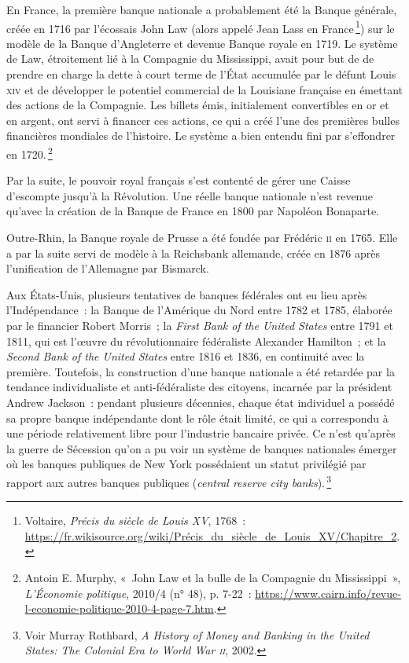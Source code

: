 \documentclass[a4paper,notitlepage]{article}
\newcommand{\eng}[1]{{\NoAutoSpaceBeforeFDP\emph{#1}}}  %
\newcommand{\sfootnote}{\,\footnote}
\begin{document}
En France, la première banque nationale a probablement été la Banque générale, créée en 1716 par l'écossais John Law (alors appelé Jean Lass en France\sfootnote{Voltaire, \eng{Précis du siècle de Louis XV}, 1768~: \url{https://fr.wikisource.org/wiki/Précis_du_siècle_de_Louis_XV/Chapitre_2}.}) sur le modèle de la Banque d'Angleterre et devenue Banque royale en 1719. Le système de Law, étroitement lié à la Compagnie du Mississippi, avait pour but de de prendre en charge la dette à court terme de l'État accumulée par le défunt Louis \textsc{xiv} et de développer le potentiel commercial de la Louisiane française en émettant des actions de la Compagnie. Les billets émis, initialement convertibles en or et en argent, ont servi à financer ces actions, ce qui a créé l'une des premières bulles financières mondiales de l'histoire. Le système a bien entendu fini par s'effondrer en 1720.\sfootnote{Antoin E. Murphy, «~John Law et la bulle de la Compagnie du Mississippi~», \emph{L'Économie politique}, 2010/4 (n° 48), p. 7-22~: \url{https://www.cairn.info/revue-l-economie-politique-2010-4-page-7.htm}.}

Par la suite, le pouvoir royal français s'est contenté de gérer une Caisse d'escompte jusqu'à la Révolution. Une réelle banque nationale n'est revenue qu'avec la création de la Banque de France en 1800 par Napoléon Bonaparte.

Outre-Rhin, la Banque royale de Prusse a été fondée par Frédéric \textsc{ii} en 1765. Elle a par la suite servi de modèle à la Reichsbank allemande, créée en 1876 après l'unification de l'Allemagne par Bismarck.

Aux États-Unis, plusieurs tentatives de banques fédérales ont eu lieu après l'Indépendance~: la Banque de l'Amérique du Nord entre 1782 et 1785, élaborée par le financier Robert Morris~; la \eng{First Bank of the United States} entre 1791 et 1811, qui est l'œuvre du révolutionnaire fédéraliste Alexander Hamilton~; et la \eng{Second Bank of the United States} entre 1816 et 1836, en continuité avec la première. Toutefois, la construction d'une banque nationale a été retardée par la tendance individualiste et anti-fédéraliste des citoyens, incarnée par la président Andrew Jackson~: pendant plusieurs décennies, chaque état individuel a possédé sa propre banque indépendante dont le rôle était limité, ce qui a correspondu à une période relativement libre pour l'industrie bancaire privée. Ce n'est qu'après la guerre de Sécession qu'on a pu voir un système de banques nationales émerger où les banques publiques de New York possédaient un statut privilégié par rapport aux autres banques publiques (\eng{central reserve city banks}).\sfootnote{Voir Murray Rothbard, \eng{A History of Money and Banking in the United States: The Colonial Era to World War \textsc{ii}}, 2002.} %
\end{document}
